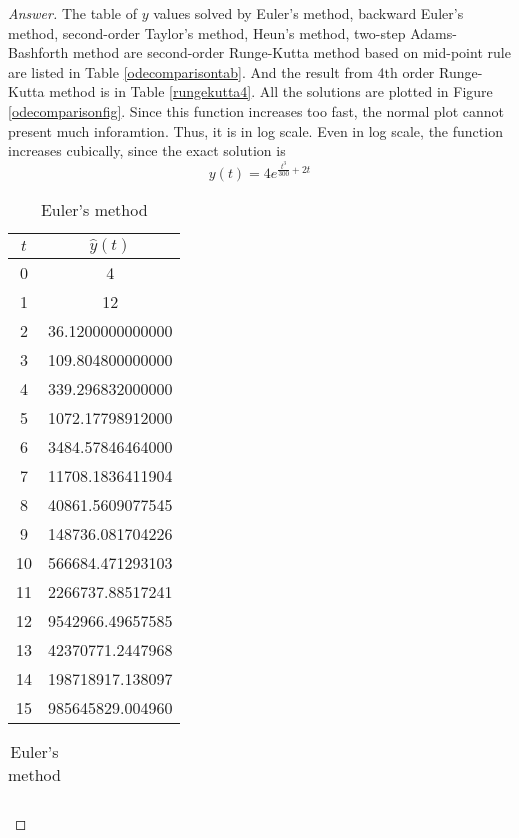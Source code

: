 \begin{proof}[Answer]
The table of \(y\) values solved by Euler's method, backward Euler's method, second-order Taylor's method, Heun's method, two-step Adams-Bashforth method are second-order Runge-Kutta method based on mid-point rule are listed in Table \ref{odecomparisontab}.
And the result from 4\(\text{th}\) order Runge-Kutta method is in Table \ref{rungekutta4}.
All the solutions are plotted in Figure \ref{odecomparisonfig}.
Since this function increases too fast, the normal plot cannot present much inforamtion.
Thus, it is in log scale.
Even in log scale, the function increases cubically, since the exact solution is
\[ y(t)=4 e^{\frac{t^3}{300}+2 t} \]


\ifnum{}
	\begin{table}[H]
\else
	\begin{table}[htbp]
\fi
	\centering
	\begin{subtable}[t]{0.32\textwidth}
		\centering
		\begin{tabular}[t]{|c|c|}
		\hline
		\(t\)	&	\(\hat{y}(t)\)	\\	\hline
		0	&	4					\\	\hline
		1	&	12					\\	\hline
		2	&	36.1200000000000	\\	\hline
		3	&	109.804800000000	\\	\hline
		4	&	339.296832000000	\\	\hline
		5	&	1072.17798912000	\\	\hline
		6	&	3484.57846464000	\\	\hline
		7	&	11708.1836411904	\\	\hline
		8	&	40861.5609077545	\\	\hline
		9	&	148736.081704226	\\	\hline
		10	&	566684.471293103	\\	\hline
		11	&	2266737.88517241	\\	\hline
		12	&	9542966.49657585	\\	\hline
		13	&	42370771.2447968	\\	\hline
		14	&	198718917.138097	\\	\hline
		15	&	985645829.004960	\\	\hline
		\end{tabular}
		\caption{Euler's method}
	\end{subtable}
	\begin{subtable}[t]{0.32\textwidth}
		\centering
		\begin{tabular}[t]{|c|c|}

\end{tabular}
\end{subtable}
\end{table}
\end{table}
\end{proof}
